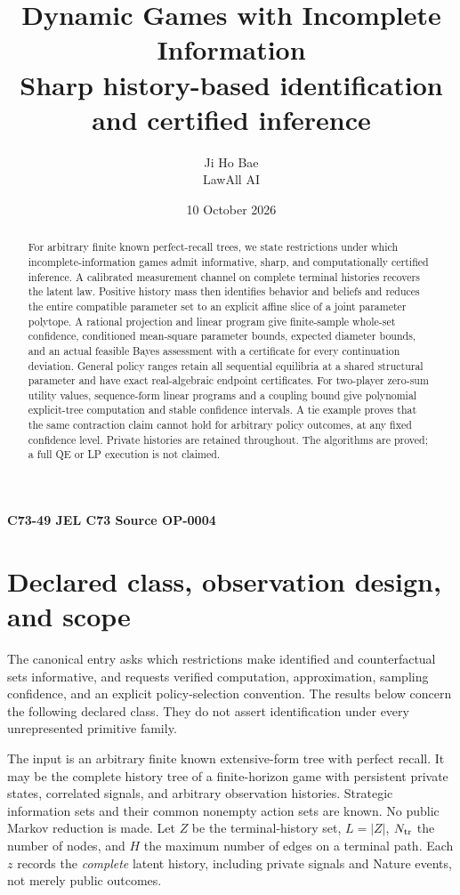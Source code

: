 \documentclass[11pt,a4paper]{article}
\title{Dynamic Games with Incomplete Information\\[4pt]
 \large Sharp history-based identification and certified inference}
\author{Ji Ho Bae\\\small LawAll AI}
\date{10 October 2026}
\numberwithin{equation}{section}
\theoremstyle{definition}
\begin{document}
\maketitle
\begin{center}
\small\textbf{C73-49 \quad JEL C73 \quad Source OP-0004}
\end{center}
\begin{abstract}
For arbitrary finite known perfect-recall trees, we state restrictions
under which incomplete-information games admit informative, sharp,
and computationally certified inference. A calibrated measurement
channel on complete terminal histories recovers the latent law.
Positive history mass then identifies behavior and beliefs and reduces
the entire compatible parameter set to an explicit affine slice of
a joint parameter polytope. A rational projection and linear program
give finite-sample whole-set confidence, conditioned mean-square
parameter bounds, expected diameter bounds, and an actual feasible
Bayes assessment with a certificate for every continuation deviation.
General policy ranges retain all sequential equilibria at a shared
structural parameter and have exact real-algebraic endpoint certificates.
For two-player zero-sum utility values, sequence-form linear programs
and a coupling bound give polynomial explicit-tree computation and
stable confidence intervals. A tie example proves that the same
contraction claim cannot hold for arbitrary policy outcomes, at any
fixed confidence level. Private histories are retained throughout.
The algorithms are proved; a full QE or LP execution is not claimed.
\end{abstract}

\section{Declared class, observation design, and scope}\label{sec:model}
The canonical entry asks which restrictions make identified and
counterfactual sets informative, and requests verified computation,
approximation, sampling confidence, and an explicit policy-selection
convention. The results below concern the following declared class. They do not assert
identification under every unrepresented primitive family.

The input is an arbitrary finite known extensive-form tree with perfect
recall. It may be the complete history tree of a finite-horizon game
with persistent private states, correlated signals, and arbitrary
observation histories. Strategic information sets and their common
nonempty action sets are known. No public Markov reduction is made.
Let \(Z\) be the terminal-history set, \(L=|Z|\), \(N_{\rm tr}\) the
number of nodes, and \(H\) the maximum number of edges on a terminal path.
Each \(z\) records the \emph{complete} latent history, including private
signals and Nature events, not merely public outcomes.
\end{document}
